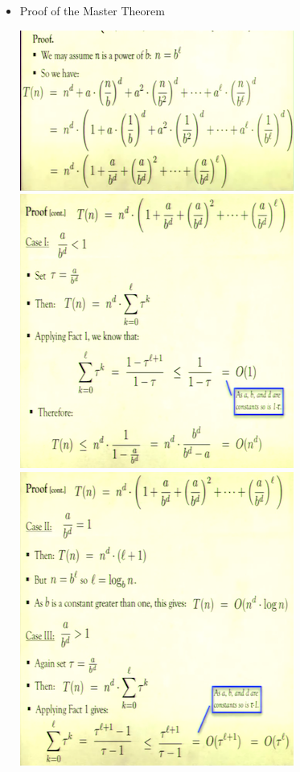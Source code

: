 \documentclass[12pt]{article}
\begin{document}
\begin{itemize}
\item Proof of the Master Theorem
\begin{center}
\includegraphics{lecture3e}
\includegraphics{lecture3f}
\includegraphics{lecture3g}

\end{center}
\end{itemize}
\end{document}
